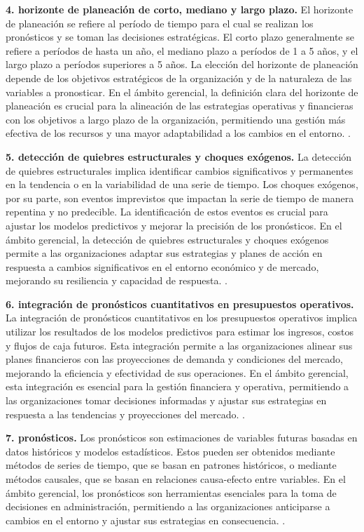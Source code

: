 {\textbf{4. horizonte de planeación de corto, mediano y largo plazo.} El horizonte de planeación se refiere al período de tiempo para el cual se realizan los pronósticos y se toman las decisiones estratégicas. El corto plazo generalmente se refiere a períodos de hasta un año, el mediano plazo a períodos de 1 a 5 años, y el largo plazo a períodos superiores a 5 años. La elección del horizonte de planeación depende de los objetivos estratégicos de la organización y de la naturaleza de las variables a pronosticar.  En el ámbito gerencial, la definición clara del horizonte de planeación es crucial para la alineación de las estrategias operativas y financieras con los objetivos a largo plazo de la organización, permitiendo una gestión más efectiva de los recursos y una mayor adaptabilidad a los cambios en el entorno. \citep{anderson2012,lind2012,wackerly2010}.

\textbf{5. detección de quiebres estructurales y choques exógenos.} La detección de quiebres estructurales implica identificar cambios significativos y permanentes en la tendencia o en la variabilidad de una serie de tiempo. Los choques exógenos, por su parte, son eventos imprevistos que impactan la serie de tiempo de manera repentina y no predecible. La identificación de estos eventos es crucial para ajustar los modelos predictivos y mejorar la precisión de los pronósticos.  En el ámbito gerencial, la detección de quiebres estructurales y choques exógenos permite a las organizaciones adaptar sus estrategias y planes de acción en respuesta a cambios significativos en el entorno económico y de mercado, mejorando su resiliencia y capacidad de respuesta. \citep{anderson2012,lind2012,wackerly2010}.

\textbf{6. integración de pronósticos cuantitativos en presupuestos operativos.} La integración de pronósticos cuantitativos en los presupuestos operativos implica utilizar los resultados de los modelos predictivos para estimar los ingresos, costos y flujos de caja futuros. Esta integración permite a las organizaciones alinear sus planes financieros con las proyecciones de demanda y condiciones del mercado, mejorando la eficiencia y efectividad de sus operaciones.  En el ámbito gerencial, esta integración es esencial para la gestión financiera y operativa, permitiendo a las organizaciones tomar decisiones informadas y ajustar sus estrategias en respuesta a las tendencias y proyecciones del mercado. \citep{anderson2012,lind2012,wackerly2010}.

\textbf{7. pronósticos.} Los pronósticos son estimaciones de variables futuras basadas en datos históricos y modelos estadísticos. Estos pueden ser obtenidos mediante métodos de series de tiempo, que se basan en patrones históricos, o mediante métodos causales, que se basan en relaciones causa-efecto entre variables.  En el ámbito gerencial, los pronósticos son herramientas esenciales para la toma de decisiones en administración, permitiendo a las organizaciones anticiparse a cambios en el entorno y ajustar sus estrategias en consecuencia. \citep{anderson2012,lind2012,wackerly2010}.

}
